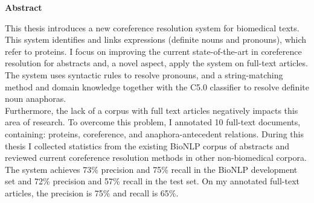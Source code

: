 

\clearemptydoublepage
{}
{}





\vspace*{2cm}
\begin{center}
{\Large \bf Abstract}
\end{center}
\vspace{1cm}
This thesis introduces a new coreference resolution system for biomedical texts. This system identifies and links expressions (definite nouns and pronouns), which refer to proteins. I focus on improving the current state-of-the-art in coreference resolution for abstracts and, a novel aspect, apply the system on full-text articles. The system uses syntactic rules to resolve pronouns, and  a string-matching method  and domain knowledge together with the C5.0 classifier to resolve definite noun anaphoras. \\
  Furthermore, the lack of a corpus with full text articles negatively impacts  this area of research. To overcome this problem, I annotated 10 full-text documents, containing: proteins, coreference, and anaphora-antecedent relations.
  During this thesis I collected statistics from the existing BioNLP corpus of abstracts and reviewed current coreference resolution methods in other non-biomedical corpora.
  The system achieves 73\% precision and 75\% recall in the BioNLP development set and 72\% precision and 57\% recall in the test set. On my annotated full-text articles, the precision is 75\% and recall is 65\%.


